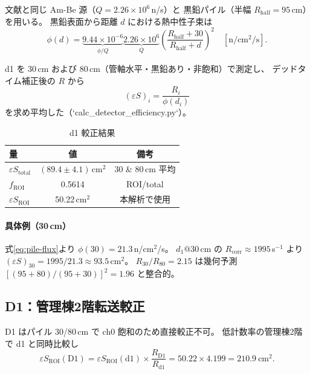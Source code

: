 \documentclass[a4paper,11pt]{ltjsarticle}
\begin{document}
文献\cite{yonei2002}と同じ Am-Be 源（$Q=2.26\times10^6$\,n/s）と
黒鉛パイル（半幅 $R_\mathrm{half}=95$\,cm）を用いる。
黒鉛表面から距離 $d$ における熱中性子束は
\begin{equation}
  \phi(d) = \underbrace{9.44\times10^{-6}}_{\phi/Q}
  \underbrace{2.26\times10^{6}}_{Q}
  \left(\frac{R_\mathrm{half}+30}{R_\mathrm{half}+d}\right)^2
  \quad [\mathrm{n/cm^2/s}].
  \label{eq:pile-flux}
\end{equation}

d1 を 30\,cm および 80\,cm（管軸水平・黒鉛あり・非飽和）で測定し、
デッドタイム補正後の $R$ から
\begin{equation}
  (\varepsilon S)_i = \frac{R_i}{\phi(d_i)}
\end{equation}
を求め平均した（`calc\_detector\_efficiency.py`）。

\begin{table}[htbp]
  \centering
  \caption{d1 較正結果}
  \label{tab:eff-d1}
  \begin{tabular}{lcc}
    \toprule
    量 & 値 & 備考 \\
    \midrule
    $\varepsilon S_\mathrm{total}$ & $(89.4 \pm 4.1)$\,cm$^2$ & 30 \& 80\,cm 平均 \\
    $f_\mathrm{ROI}$ & 0.5614 & ROI/total \\
    $\varepsilon S_\mathrm{ROI}$ & 50.22\,cm$^2$ & 本解析で使用 \\
    \bottomrule
  \end{tabular}
\end{table}

\paragraph{具体例（30\,cm）}
式\eqref{eq:pile-flux}より $\phi(30)=21.3$\,n/cm$^2$/s。
$d_1@30$\,cm の $R_\mathrm{corr}\approx1995$\,s$^{-1}$ より
$(\varepsilon S)_{30}=1995/21.3\approx93.5$\,cm$^2$。
$R_{30}/R_{80}=2.15$ は幾何予測 $[(95+80)/(95+30)]^2=1.96$ と整合的。

\subsection{D1：管理棟2階転送較正}

D1 はパイル 30/80\,cm で ch0 飽和のため直接較正不可。
低計数率の管理棟2階で d1 と同時比較し
\begin{equation}
  \varepsilon S_\mathrm{ROI}(\mathrm{D1})
  = \varepsilon S_\mathrm{ROI}(\mathrm{d1}) \times
  \frac{R_\mathrm{D1}}{R_\mathrm{d1}}
  = 50.22 \times 4.199 = 210.9\ \mathrm{cm^2}.
\end{equation}
\end{document}
